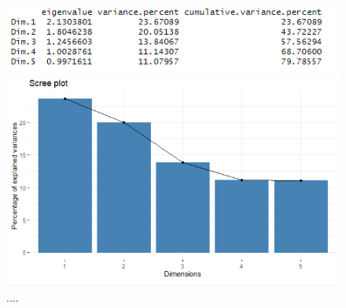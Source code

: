 \documentclass{FR16}
\begin{document}
\begin{figure}[!htb]
   \begin{minipage}{0.48\textwidth}
     \centering
    \includegraphics[width=1\textwidth]{figures/FAMD.PNG} 
 \caption{\label{fig:31} ...}
   \end{minipage}\hfill
   \begin{minipage}{0.48\textwidth}
     \centering
       \includegraphics[width=1\textwidth]{figures/FAMD2.PNG} 
 \caption{\label{fig:32} .... }
   \end{minipage}
   
\end{figure}
\end{document}
